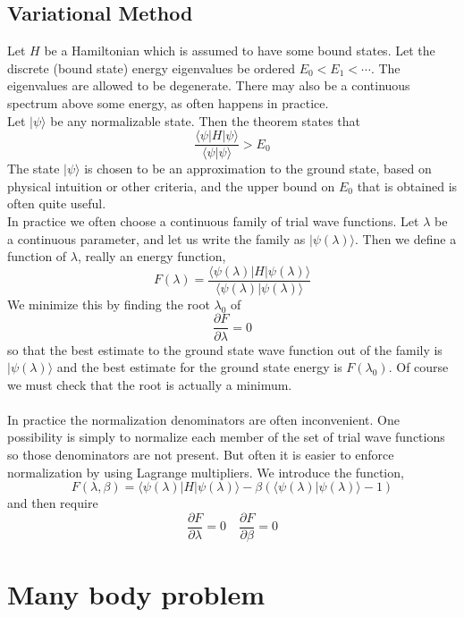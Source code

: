 \section{Variational Method}
Let $H$ be a Hamiltonian which is assumed to have some bound states. Let the discrete (bound state) energy eigenvalues be ordered $E_0 < E_1 < \cdots$. The eigenvalues are allowed to be degenerate. There may also be a continuous spectrum above some energy, as often happens in practice.\\
Let $|\psi\rangle$ be any normalizable state. Then the theorem states that
\[\frac{\langle \psi | H | \psi \rangle}{\langle \psi | \psi \rangle} > E_0\]
The state $|\psi\rangle$ is chosen to be an approximation to the ground state, based on physical intuition or other criteria, and the upper bound on $E_0$ that is obtained is often quite useful. \\
In practice we often choose a continuous family of trial wave functions. Let $\lambda$ be a continuous parameter, and let us write the family as $|\psi(\lambda)\rangle$. Then we define a function of $\lambda$, really an energy function,
\[F(\lambda) = \frac{\langle \psi(\lambda) | H | \psi(\lambda) \rangle}{\langle \psi(\lambda) | \psi(\lambda) \rangle}\]
We minimize this by finding the root $\lambda_0$ of
\[\frac{\partial F}{\partial \lambda} = 0\]
so that the best estimate to the ground state wave function out of the family is $|\psi(\lambda)\rangle$ and the best estimate for the ground state energy is $F(\lambda_0)$. 
Of course we must check that the root is actually a minimum.
\\ \\
In practice the normalization denominators are often inconvenient. One possibility is simply to normalize each member of the set of trial wave functions so those denominators are not
present. 
But often it is easier to enforce normalization by using Lagrange multipliers. We introduce the function,
\[F(\lambda,\beta) = \langle \psi(\lambda) | H | \psi(\lambda) \rangle - \beta (\langle \psi(\lambda) | \psi(\lambda) \rangle - 1)\]
and then require
\[\frac{\partial F}{\partial \lambda} = 0 \quad \frac{\partial F}{\partial \beta} = 0\]


\chapter{Many body problem}
